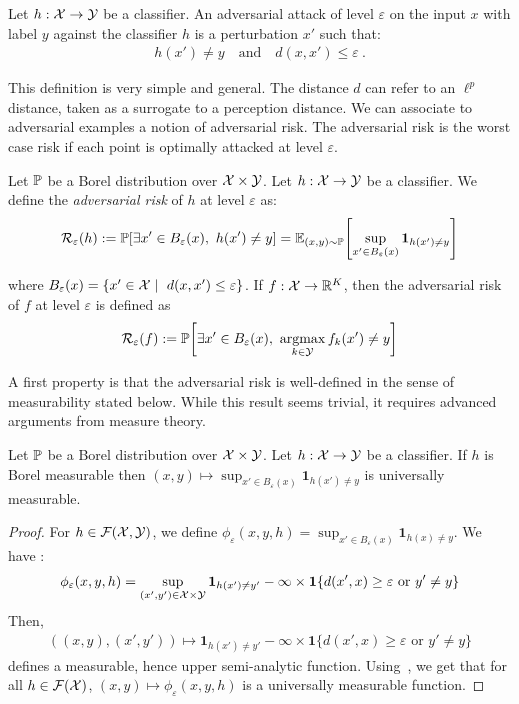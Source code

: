 \begin{definition} 
    Let $h:\mathcal{X}\to\mathcal{Y}$ be a classifier. An adversarial attack of level $\varepsilon$ on the input $x$ with label $y$ against the classifier $h$ is a perturbation $x'$ such that:
    \begin{align*}
        h(x')\neq y\quad\text{and}\quad d(x,x')\leq\varepsilon~.
    \end{align*}
\end{definition}
This definition is very simple and general. The distance $d$ can refer to an $\ell^p$ distance, taken as a surrogate to a perception distance. We can associate to adversarial examples a notion of adversarial risk. The adversarial risk is the worst case risk if each point is optimally attacked at level $\varepsilon$.
\begin{definition}
  Let $\mathbb{P}$ be a Borel distribution over $\mathcal{X} \times \mathcal{Y}$. Let $h:\mathcal{X}\to\mathcal{Y}$ be a classifier. We define the \emph{adversarial risk} of $h$ at level $\varepsilon$ as:
  \begin{align*}
    \risk_\varepsilon(h):=\PP\left[\exists x'\in B_\varepsilon(x),~h(x')\neq y\right] = \mathbb{E}_{(x,y)\sim\PP}\left[\sup_{x'\in B_\varepsilon(x)}\mathbf{1}_{h(x')\neq y}\right]
  \end{align*}

  where $B_\varepsilon(x) = \{x'\in\mathcal{X}\mid~d(x,x')\leq\varepsilon\}$. If $f:\mathcal{X}\to\mathbb{R}^K$, then the adversarial risk of $f$ at level $\varepsilon$ is defined as
   \begin{align*}
    \risk_{\varepsilon}(f):=\PP\left[\exists x'\in B_\varepsilon(x),~\argmaxB_{k\in\YY}f_k(x')\neq y\right]
   \end{align*}
\end{definition}
A first property is that the adversarial risk is well-defined in the sense of measurability stated below. While this result seems trivial, it requires advanced arguments from measure theory. 
\begin{prop}
  Let $\mathbb{P}$ be a Borel distribution over $\mathcal{X} \times \mathcal{Y}$. Let $h:\mathcal{X}\to\mathcal{Y}$ be a classifier. If $h$ is Borel measurable then $(x,y)\mapsto \sup_{x'\in B_\varepsilon(x)}\mathbf{1}_{h(x')\neq y}$ is universally measurable.
\end{prop}
\begin{proof}
  For $h\in\mathcal{F}(\mathcal{X},\mathcal{Y})$, we define $\phi_\varepsilon(x,y,h) = \sup_{x'\in B_\varepsilon(x)}\mathbf{1}_{h(x)\neq y}$.  We have :
  \begin{align*}
     \phi_\varepsilon(x,y,h) =  \sup_{(x',y')\in\mathcal{X}\times\mathcal{Y}}\mathbf{1}_{h(x')\neq y'}-\infty\times \mathbf{1}\{d(x',x)\geq \varepsilon\text{ or }y'\neq y\}
  \end{align*}
  Then,
  \begin{align*}
      \left((x,y),(x',y')\right)\mapsto\mathbf{1}_{h(x')\neq y'}-\infty\times \mathbf{1}\{d(x',x)\geq \varepsilon\text{ or }y'\neq y\}
  \end{align*}
  defines a measurable, hence upper semi-analytic function. Using~\citep[Proposition 7.39, Corollary 7.42]{bertsekas2004stochastic}, we get that for all $h\in\mathcal{F}(\mathcal{X})$, $(x,y)\mapsto\phi_\varepsilon(x,y,h)$ is a universally measurable function.
\end{proof}

